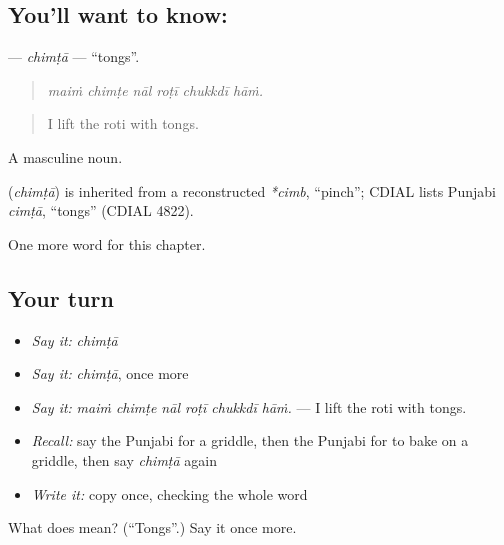 \subsection*{You'll want to know: }
\textbf{} — \emph{chimṭā} — \textquotedblleft{}tongs\textquotedblright{}.

\begin{quote}
     
\end{quote}

\begin{quote}
\emph{maiṁ chimṭe nāl roṭī chukkdī hāṁ.}
\end{quote}

\begin{quote}
I lift the roti with tongs.
\end{quote}

A masculine noun.

\begin{cousinweb}
\textbf{} (\emph{chimṭā}) is inherited from a reconstructed \emph{*cimb}, \textquotedblleft{}pinch\textquotedblright{}; CDIAL lists Punjabi \emph{cimṭā}, \textquotedblleft{}tongs\textquotedblright{} (CDIAL 4822).
\end{cousinweb}

\begin{grammarlens}[title={What you've built}]
One more word for this chapter.
\end{grammarlens}

\subsection*{Your turn}
\begin{itemize}
\raggedright
  \item \emph{Say it:} \emph{chimṭā}
  \item \emph{Say it:} \emph{chimṭā}, once more
  \item \emph{Say it:} \emph{maiṁ chimṭe nāl roṭī chukkdī hāṁ.} — I lift the roti with tongs.
  \item \emph{Recall:} say the Punjabi for a griddle, then the Punjabi for to bake on a griddle, then say \emph{chimṭā} again
  \item \emph{Write it:} copy \textbf{} once, checking the whole word
\end{itemize}

\begin{tcolorbox}[breakable,colback=teal!4,colframe=teal!35!black,title={Before you move on}]
What does  mean? (\textquotedblleft{}Tongs\textquotedblright{}.) Say it once more.
\end{tcolorbox}
